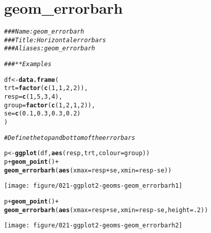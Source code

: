 \documentclass[a4paper,titlepage]{tufte-handout}\usepackage[]{graphicx}\usepackage[]{color}
\makeatletter
\def\maxwidth{ %
  \ifdim\Gin@nat@width>\linewidth
    \linewidth
  \else
    \Gin@nat@width
  \fi
}
\newcommand{\hlnum}[1]{\textcolor[rgb]{0.686,0.059,0.569}{#1}}%
\newcommand{\hlcom}[1]{\textcolor[rgb]{0.678,0.584,0.686}{\textit{#1}}}%
\newcommand{\hlopt}[1]{\textcolor[rgb]{0,0,0}{#1}}%
\newcommand{\hlstd}[1]{\textcolor[rgb]{0.345,0.345,0.345}{#1}}%
\newcommand{\hlkwb}[1]{\textcolor[rgb]{0.69,0.353,0.396}{#1}}%
\newcommand{\hlkwc}[1]{\textcolor[rgb]{0.333,0.667,0.333}{#1}}%
\newcommand{\hlkwd}[1]{\textcolor[rgb]{0.737,0.353,0.396}{\textbf{#1}}}%
\newenvironment{kframe}{%
 \def\at@end@of@kframe{}%
 \ifinner\ifhmode%
  \def\at@end@of@kframe{\end{minipage}}%
  \begin{minipage}{\columnwidth}%
 \fi\fi%
 \def\FrameCommand##1{\hskip\@totalleftmargin \hskip-\fboxsep
 \colorbox{shadecolor}{##1}\hskip-\fboxsep
     \hskip-\linewidth \hskip-\@totalleftmargin \hskip\columnwidth}%
 \MakeFramed {\advance\hsize-\width
   \@totalleftmargin\z@ \linewidth\hsize
   \@setminipage}}%
 {\par\unskip\endMakeFramed%
 \at@end@of@kframe}
\newenvironment{knitrout}{}{} %
\makeatother
\begin{document}
\section{geom\_errorbarh}

\begin{knitrout}
\color{fgcolor}\begin{kframe}
\begin{alltt}
\hlcom{### Name: geom_errorbarh}
\hlcom{### Title: Horizontal error bars}
\hlcom{### Aliases: geom_errorbarh}

\hlcom{### ** Examples}

\hlstd{df} \hlkwb{<-} \hlkwd{data.frame}\hlstd{(}
  \hlkwc{trt} \hlstd{=} \hlkwd{factor}\hlstd{(}\hlkwd{c}\hlstd{(}\hlnum{1}\hlstd{,} \hlnum{1}\hlstd{,} \hlnum{2}\hlstd{,} \hlnum{2}\hlstd{)),}
  \hlkwc{resp} \hlstd{=} \hlkwd{c}\hlstd{(}\hlnum{1}\hlstd{,} \hlnum{5}\hlstd{,} \hlnum{3}\hlstd{,} \hlnum{4}\hlstd{),}
  \hlkwc{group} \hlstd{=} \hlkwd{factor}\hlstd{(}\hlkwd{c}\hlstd{(}\hlnum{1}\hlstd{,} \hlnum{2}\hlstd{,} \hlnum{1}\hlstd{,} \hlnum{2}\hlstd{)),}
  \hlkwc{se} \hlstd{=} \hlkwd{c}\hlstd{(}\hlnum{0.1}\hlstd{,} \hlnum{0.3}\hlstd{,} \hlnum{0.3}\hlstd{,} \hlnum{0.2}\hlstd{)}
\hlstd{)}

\hlcom{# Define the top and bottom of the errorbars}

\hlstd{p} \hlkwb{<-} \hlkwd{ggplot}\hlstd{(df,} \hlkwd{aes}\hlstd{(resp, trt,} \hlkwc{colour} \hlstd{= group))}
\hlstd{p} \hlopt{+} \hlkwd{geom_point}\hlstd{()} \hlopt{+}
  \hlkwd{geom_errorbarh}\hlstd{(}\hlkwd{aes}\hlstd{(}\hlkwc{xmax} \hlstd{= resp} \hlopt{+} \hlstd{se,} \hlkwc{xmin} \hlstd{= resp} \hlopt{-} \hlstd{se))}
\end{alltt}
\end{kframe}
\texttt{[image: figure/021-ggplot2-geoms-geom\_errorbarh1]} 
\begin{kframe}\begin{alltt}
\hlstd{p} \hlopt{+} \hlkwd{geom_point}\hlstd{()} \hlopt{+}
  \hlkwd{geom_errorbarh}\hlstd{(}\hlkwd{aes}\hlstd{(}\hlkwc{xmax} \hlstd{= resp} \hlopt{+} \hlstd{se,} \hlkwc{xmin} \hlstd{= resp} \hlopt{-} \hlstd{se,} \hlkwc{height} \hlstd{=} \hlnum{.2}\hlstd{))}
\end{alltt}
\end{kframe}
\texttt{[image: figure/021-ggplot2-geoms-geom\_errorbarh2]} 

\end{knitrout}
\end{document}
